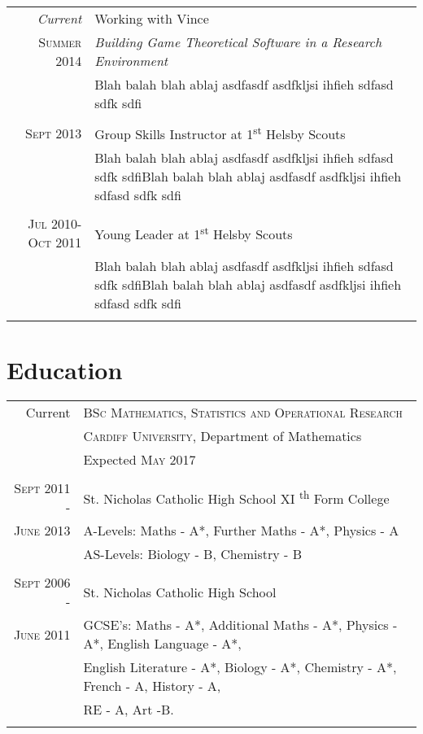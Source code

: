 \documentclass[a4paper, 11pt]{article}
\begin{document}
{\begin{tabular}{r|p{11cm}}
\emph{Current} & Working with Vince \\
\textsc{Summer 2014} & \emph{Building Game Theoretical Software in a Research Environment}\\
& \footnotesize{Blah balah blah ablaj asdfasdf asdfkljsi ihfieh sdfasd sdfk sdfi}\\
\\
\textsc{Sept 2013} & Group Skills Instructor at 1\textsuperscript{st} Helsby Scouts\\
& \footnotesize{Blah balah blah ablaj asdfasdf asdfkljsi ihfieh sdfasd sdfk sdfiBlah balah blah ablaj asdfasdf asdfkljsi ihfieh sdfasd sdfk sdfi}\\
\\
\textsc{Jul 2010-Oct 2011} & Young Leader at 1\textsuperscript{st} Helsby Scouts\\
& \footnotesize{Blah balah blah ablaj asdfasdf asdfkljsi ihfieh sdfasd sdfk sdfiBlah balah blah ablaj asdfasdf asdfkljsi ihfieh sdfasd sdfk sdfi}\\
\\

\end{tabular}
\section{Education}
\begin{tabular}{rl}

Current & \textsc{BSc Mathematics, Statistics and Operational Research} \\
&\normalsize \textsc{Cardiff University}, Department of Mathematics\\
& Expected \textsc{May} 2017\\
\\
\textsc{Sept 2011 -} & St. Nicholas Catholic High School XI \textsuperscript{th} Form College\\
\textsc{June 2013} & A-Levels: Maths - A*, Further Maths - A*, Physics - A\\
& AS-Levels: Biology - B, Chemistry - B\\
\\
\textsc{Sept 2006 -} & St. Nicholas Catholic High School\\
\textsc{June 2011} & GCSE's: Maths - A*, Additional Maths - A*, Physics - A*, English Language - A*,\\
& English Literature - A*, Biology - A*, Chemistry - A*, French - A, History - A,\\
& RE - A, Art -B.\\
\\


\end{tabular}}
\end{document}
